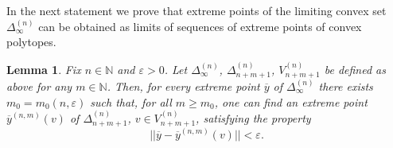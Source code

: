 \documentclass[11pt, english, reqno]{amsart}
\theoremstyle{definition}
\theoremstyle{remark}
\theoremstyle{plain}
\newtheorem{lemma}[defin]{Lemma}
\def\ov{\overline}
\numberwithin{equation}{section}
\begin{document}
In the next statement we prove that  extreme points of the limiting convex set
$\Delta^{(n)}_{\infty}$ can be obtained as limits of sequences of extreme points
 of convex polytopes.

\begin{lemma}\label{remar3}
Fix $n \in \mathbb{N}$ and $\varepsilon >0$.  Let
$\Delta^{(n)}_{\infty}$,
$\Delta_{n+m+1}^{(n)}$, $V^{(n)}_{n+m+1}$ be defined as above for
any $m \in \mathbb{N}$. Then, for every extreme point $\ov y$ of
$\Delta^{(n)}_{\infty}$ there exists $m_0 = m_0(n,\varepsilon)$ such that,
 for all $m \geq m_0$, one can find an extreme point $\ov y^{(n,m)}(v)$ of
  $\Delta_{n+m+1}^{(n)}$,  $v \in V^{(n)}_{n+m+1}$,
satisfying the property
$$
 ||\ov y - \ov y^{(n,m)}(v)|| < \varepsilon.
 $$
\end{lemma}
\end{document}

